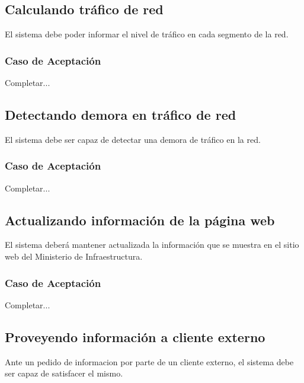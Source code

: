 \linea \subsection*{Calculando tráfico de red}
El sistema debe poder informar el nivel de tráfico en cada segmento de la red.
\subsubsection*{Caso de Aceptación}
Completar...

\linea \subsection*{Detectando demora en tráfico de red}
El sistema debe ser capaz de detectar una demora de tráfico en la red.
\subsubsection*{Caso de Aceptación}
Completar...

\linea \subsection*{Actualizando información de la página web}
El sistema deberá mantener actualizada la información que se muestra en el sitio web del Ministerio de Infraestructura.
\subsubsection*{Caso de Aceptación}
Completar...

\linea \subsection*{Proveyendo información a cliente externo}
Ante un pedido de informacion por parte de un cliente externo, el sistema debe ser capaz de satisfacer el mismo.
